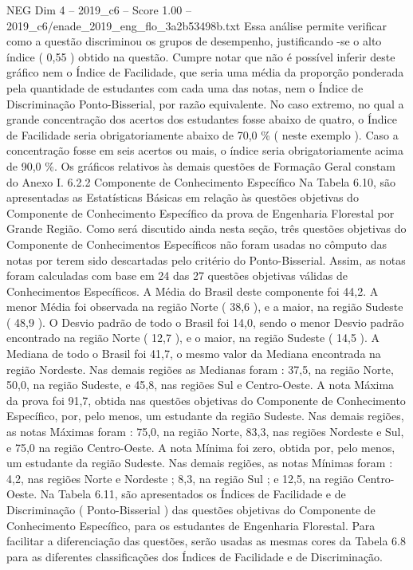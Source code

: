 \begin{textsample}{NEG Dim 4 – 2019\_c6 – Score 1.00 – 2019\_c6/enade\_2019\_eng\_flo\_3a2b53498b.txt}
Essa análise permite verificar como a questão discriminou os grupos de desempenho, justificando -se o alto índice ( 0,55 ) obtido na questão.
Cumpre notar que não é possível inferir deste gráfico nem o Índice de Facilidade, que seria uma média da proporção ponderada pela quantidade de estudantes com cada uma das notas, nem o Índice de Discriminação Ponto-Bisserial, por razão equivalente.
No caso extremo, no qual a grande concentração dos acertos dos estudantes fosse abaixo de quatro, o Índice de Facilidade seria obrigatoriamente abaixo de 70,0 \% ( neste exemplo ).
Caso a concentração fosse em seis acertos ou mais, o índice seria obrigatoriamente acima de 90,0 \%.
Os gráficos relativos às demais questões de Formação Geral constam do Anexo I. 6.2.2 Componente de Conhecimento Específico Na Tabela 6.10, são apresentadas as Estatísticas Básicas em relação às questões objetivas do Componente de Conhecimento Específico da prova de Engenharia Florestal por Grande Região.
Como será discutido ainda nesta seção, três questões objetivas do Componente de Conhecimentos Específicos não foram usadas no cômputo das notas por terem sido descartadas pelo critério do Ponto-Bisserial.
Assim, as notas foram calculadas com base em 24 das 27 questões objetivas válidas de Conhecimentos Específicos.
A Média do Brasil deste componente foi 44,2.
A menor Média foi observada na região Norte ( 38,6 ), e a maior, na região Sudeste ( 48,9 ).
O Desvio padrão de todo o Brasil foi 14,0, sendo o menor Desvio padrão encontrado na região Norte ( 12,7 ), e o maior, na região Sudeste ( 14,5 ).
A Mediana de todo o Brasil foi 41,7, o mesmo valor da Mediana encontrada na região Nordeste.
Nas demais regiões as Medianas foram : 37,5, na região Norte, 50,0, na região Sudeste, e 45,8, nas regiões Sul e Centro-Oeste.
A nota Máxima da prova foi 91,7, obtida nas questões objetivas do Componente de Conhecimento Específico, por, pelo menos, um estudante da região Sudeste.
Nas demais regiões, as notas Máximas foram : 75,0, na região Norte, 83,3, nas regiões Nordeste e Sul, e 75,0 na região Centro-Oeste.
A nota Mínima foi zero, obtida por, pelo menos, um estudante da região Sudeste.
Nas demais regiões, as notas Mínimas foram : 4,2, nas regiões Norte e Nordeste ; 8,3, na região Sul ; e 12,5, na região Centro-Oeste.
Na Tabela 6.11, são apresentados os Índices de Facilidade e de Discriminação ( Ponto-Bisserial ) das questões objetivas do Componente de Conhecimento Específico, para os estudantes de Engenharia Florestal.
Para facilitar a diferenciação das questões, serão usadas as mesmas cores da Tabela 6.8 para as diferentes classificações dos Índices de Facilidade e de Discriminação.

\end{textsample}
